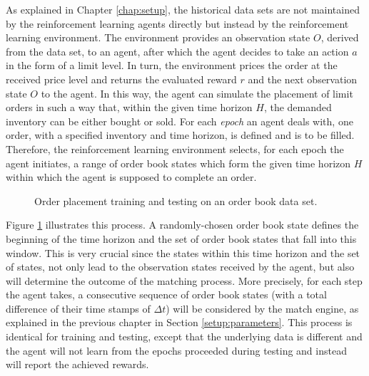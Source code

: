 As explained in Chapter \ref{chap:setup}, the historical data sets are not maintained by the reinforcement learning agents directly but instead by the reinforcement learning environment.
The environment provides an observation state $O$, derived from the data set, to an agent, after which the agent decides to take an action $a$ in the form of a limit level.
In turn, the environment prices the order at the received price level and returns the evaluated reward $r$ and the next observation state $O$ to the agent.
In this way, the agent can simulate the placement of limit orders in such a way that, within the given time horizon $H$, the demanded inventory can be either bought or sold.
For each \textit{epoch} an agent deals with, one order, with a specified inventory and time horizon, is defined and is to be filled.
Therefore, the reinforcement learning environment selects, for each epoch the agent initiates, a range of order book states which form the given time horizon $H$ within which the agent is supposed to complete an order.
\begin{figure}[H]
    \centering
    \caption{Order placement training and testing on an order book data set.}
    \label{fig:eval-orderbook-window}
\end{figure}
Figure \ref{fig:eval-orderbook-window} illustrates this process.
A randomly-chosen order book state defines the beginning of the time horizon and the set of order book states that fall into this window.
This is very crucial since the states within this time horizon and the set of states, not only lead to the observation states received by the agent, but also will determine the outcome of the matching process.
More precisely, for each step the agent takes, a consecutive sequence of order book states (with a total difference of their time stamps of $\Delta{t}$) will be considered by the match engine, as explained in the previous chapter in Section \ref{setup:parameters}.
This process is identical for training and testing, except that the underlying data is different and the agent will not learn from the epochs proceeded during testing and instead will report the achieved rewards.

